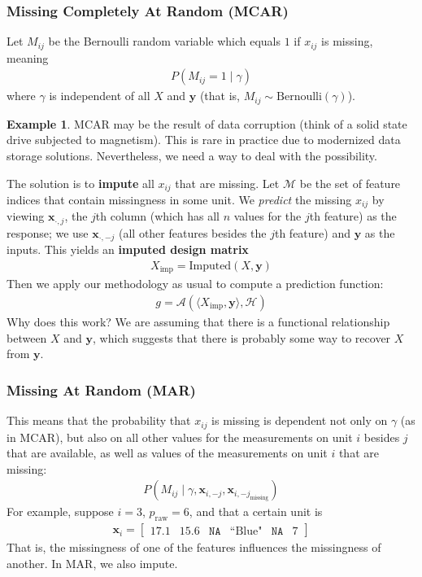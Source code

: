 \documentclass[12pt, a4paper]{article}
\theoremstyle{definition}
\newtheorem*{example}{Example}
\begin{document}
	\subsubsection{Missing Completely At Random (MCAR)}
	Let $M_{ij}$ be the Bernoulli random variable which equals $1$ if $x_{ij}$
	is missing, meaning
	\begin{align*}
		P(M_{ij} = 1 \mid \gamma)
	\end{align*}
	where $\gamma$ is independent of all $X$ and $\bm{y}$ (that is,
	$M_{ij} \sim \text{Bernoulli}(\gamma)$).
	
	\begin{tcolorbox}[breakable]
		\begin{example}
			MCAR may be the result of data corruption (think of a solid
			state drive subjected to magnetism). This is rare in practice due to
			modernized data storage solutions. Nevertheless, we need a way to deal with
			the possibility.
		\end{example}
	\end{tcolorbox}
	
	The solution is to \textbf{impute} all $x_{ij}$ that are missing. Let
	$\mathcal{M}$ be the set of feature indices that contain missingness
	in some unit. We \textit{predict} the missing $x_{ij}$ by viewing
	$\bm{x}_{\cdot, j}$, the $j$th column (which has all $n$ values for the $j$th feature)
	as the response; we use $\bm{x}_{\cdot, -j}$ (all other features besides the
	$j$th feature) and $\bm{y}$ as the inputs. This yields an \textbf{imputed design matrix}
	\begin{align*}
		X_{\text{imp}} = \text{Imputed}(X, \bm{y})
	\end{align*}
	Then we apply our methodology as usual to compute a prediction function:
	\begin{align*}
		g = \mathcal{A}(\langle X_{\text{imp}}, \bm{y} \rangle, \mathcal{H})
	\end{align*}
	Why does this work? We are assuming that there is a functional relationship
	between $X$ and $\bm{y}$, which suggests that there is probably some
	way to recover $X$ from $\bm{y}$.
	\subsubsection{Missing At Random (MAR)}
	This means that the probability that $x_{ij}$ is missing is dependent
	not only on $\gamma$ (as in MCAR), but also on all other values for
	the measurements on unit $i$ besides $j$ that are available, as well as values
	of the measurements on unit $i$ that are missing:
	\begin{align*}
		P\left(M_{ij} \mid \gamma, \bm{x}_{i, -j}, \bm{x}_{i, -j_{\text{missing}}}\right)
	\end{align*}
	For example, suppose $i = 3$, $p_{\text{raw}} = 6$, and that a certain unit is
	\begin{align*}
		\bm{x}_i = \begin{bmatrix}
			17.1 & 15.6 & \texttt{NA} & \text{``Blue"} & \texttt{NA} & 7
		\end{bmatrix}
	\end{align*}
	That is, the missingness of one of the features influences the missingness
	of another. In MAR, we also impute.
	
\end{document}
